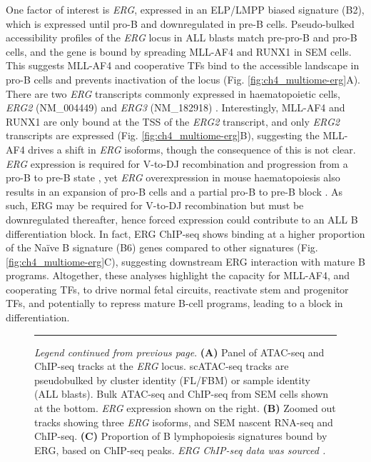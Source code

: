 One factor of interest is \textit{ERG}, expressed in an ELP/LMPP biased signature (B2), which is expressed until pro-B and downregulated in pre-B cells. Pseudo-bulked accessibility profiles of the \textit{ERG} locus in ALL blasts match pre-pro-B and pro-B cells, and the gene is bound by spreading MLL-AF4 and RUNX1 in SEM cells. This suggests MLL-AF4 and cooperative TFs bind to the accessible landscape in pro-B cells and prevents inactivation of the locus (Fig. \ref{fig:ch4_multiome-erg}A). There are two \textit{ERG} transcripts commonly expressed in haematopoietic cells, \textit{ERG2} (NM\_004449) and \textit{ERG3} (NM\_182918) \citep{bohne_epigenetic_2009}. Interestingly, MLL-AF4 and RUNX1 are only bound at the TSS of the \textit{ERG2} transcript, and only \textit{ERG2} transcripts are expressed (Fig. \ref{fig:ch4_multiome-erg}B), suggesting the MLL-AF4 drives a shift in \textit{ERG} isoforms, though the consequence of this is not clear. \textit{ERG} expression is required for V-to-DJ recombination and progression from a pro-B to pre-B state \citep{sondergaard_erg_2019}, yet \textit{ERG} overexpression in mouse haematopoiesis also results in an expansion of pro-B cells and a partial pro-B to pre-B block \citep{tsuzuki_promotion_2011}. As such, ERG may be required for V-to-DJ recombination but must be downregulated thereafter, hence forced expression could contribute to an ALL B differentiation block. In fact, ERG ChIP-seq shows binding at a higher proportion of the Na\"{i}ve B signature (B6) genes compared to other signatures (Fig. \ref{fig:ch4_multiome-erg}C), suggesting downstream ERG interaction with mature B programs. Altogether, these analyses highlight the capacity for MLL-AF4, and cooperating TFs, to drive normal fetal circuits, reactivate stem and progenitor TFs, and potentially to repress mature B-cell programs, leading to a block in differentiation.
\begin{figure}[!t]
    \ContinuedFloat
    \hrule
    \vspace{5mm}
    \caption[]
    {\textit{Legend continued from previous page}. 
    \textbf{(A)} Panel of ATAC-seq and ChIP-seq tracks at the \textit{ERG} locus. scATAC-seq tracks are pseudobulked by cluster identity (FL/FBM) or sample identity (ALL blasts). Bulk ATAC-seq and ChIP-seq from SEM cells shown at the bottom. \textit{ERG} expression shown on the right.
    \textbf{(B)} Zoomed out tracks showing three \textit{ERG} isoforms, and SEM nascent RNA-seq and ChIP-seq.
    \textbf{(C)} Proportion of B lymphopoiesis signatures bound by ERG, based on ChIP-seq peaks. 
    \textit{ERG ChIP-seq data was sourced \citep{godfrey_dot1l_2019}.}
    }
\end{figure}
\vspace*{3in}



